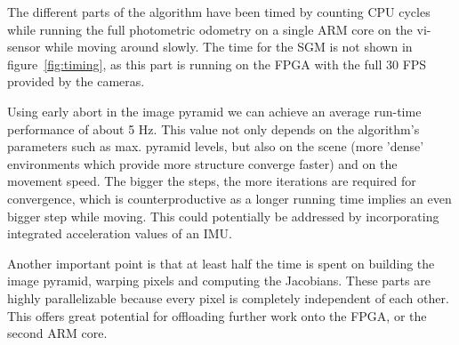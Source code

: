 The different parts of the algorithm have been timed by counting CPU cycles
while running the full photometric odometry on a single ARM core on the
vi-sensor while moving around slowly. The time for the SGM is not shown in
figure~\ref{fig:timing}, as this part is running on the FPGA with the full 30
FPS provided by the cameras.

Using early abort in the image pyramid we can achieve an average run-time
performance of about 5 Hz.
This value not only depends on the algorithm's parameters such as max. pyramid
levels, but also on the scene (more 'dense' environments which provide more
structure converge faster) and on the movement speed. The bigger the steps, the
more iterations are required for convergence, which is counterproductive as a
longer running time implies an even bigger step while moving. This could
potentially be addressed by incorporating integrated acceleration values of an
IMU.

Another important point is that at least half the time is spent on building the
image pyramid, warping pixels and computing the Jacobians. These parts are
highly parallelizable because every pixel is completely independent of each
other. This offers great potential for offloading further work onto the FPGA,
or the second ARM core.
